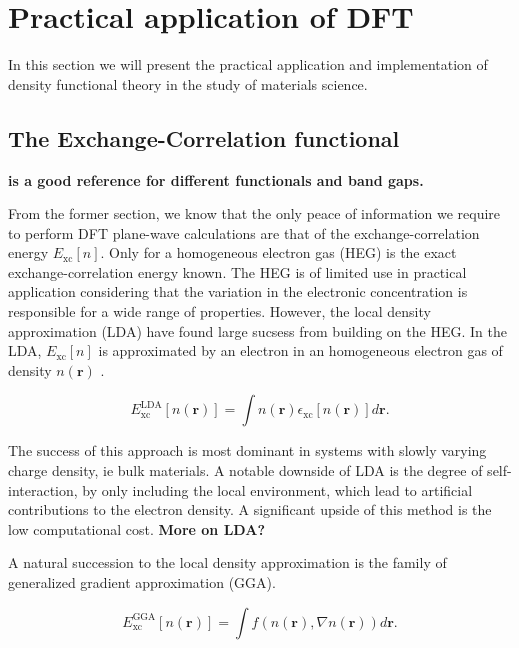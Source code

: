 \chapter{Practical application of DFT}
\label{sec:Practical DFT}

In this section we will present the practical application and implementation of density functional theory in the study of materials science.

\section{The Exchange-Correlation functional}
\textbf{\cite{XC_bandgap} is a good reference for different functionals and band gaps.}

From the former section, we know that the only peace of information we require to perform DFT plane-wave calculations are that of the exchange-correlation energy $E_{\text{xc}}[n]$. Only for a homogeneous electron gas (HEG) is the exact exchange-correlation energy known. The HEG is of limited use in practical application considering that the variation in the electronic concentration is responsible for a wide range of properties. However, the local density approximation (LDA) have found large sucsess from building on the HEG. In the LDA, $E_{\text{xc}}[n]$ is  approximated by an electron in an homogeneous electron gas of density $n(\boldsymbol{r})$ .  

\begin{equation}
    E_{\text{xc}}^{\text{LDA}}[n(\boldsymbol{r})] = \int n(\boldsymbol{r})\epsilon_{\text{xc}}[n(\boldsymbol{r})]d\boldsymbol{r}.
\end{equation}

The success of this approach is most dominant in systems with slowly varying charge density, ie bulk materials. A notable downside of LDA is the degree of self-interaction, by only including the local environment, which lead to artificial contributions to the electron density. A significant upside of this method is the low computational cost. \textbf{More on LDA?}

A natural succession to the local density approximation is the family of generalized gradient approximation (GGA).  

\begin{equation}
  E_{\text{xc}}^{\text{GGA}}[n(\boldsymbol{r})] = \int f(n(\boldsymbol{r}), \nabla n(\boldsymbol{r}))d\boldsymbol{r}.
\end{equation}

